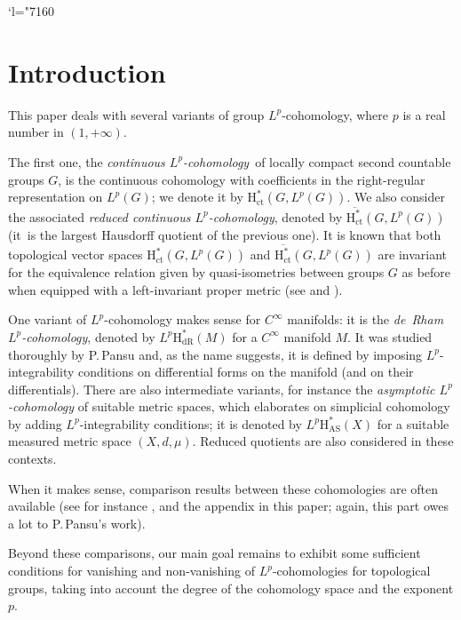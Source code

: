 \documentclass[JEP,XML,SOM,Unicode,published]{cedram}
\newcommand{\Changel}{\mathcode`l="7160}
\newcommand{\AS}{\mathrm{AS}}
\newcommand{\ct}{\mathrm{ct}}
\newcommand{\dR}{\mathrm{dR}}
\newcommand{\rH}{\mathrm{H}}
\theoremstyle{plain}
\theoremstyle{remark}
\theoremstyle{definition}
\begin{document}
\maketitle
\tableofcontents
\mainmatter
\Changel

\section*{Introduction}
\label{1}

This paper deals with several variants of group $L^p$\nobreakdash-cohomology, where $p$ is
a real number in $(1, +\infty)$.

The first one, the \emph{continuous $L^p$\nobreakdash-cohomology}~of locally compact second countable groups $G$, is the continuous cohomology \cite[Chap.\,IX]{BW} with coefficients in the right-regular representation on $L^p(G)$; we denote it by $\rH^*_\ct (G, L^p(G))$.
We also consider the associated \emph{reduced continuous $L^p$\nobreakdash-cohomology}, denoted by $\overline{\rH^*_\ct} (G, L^p(G))$
(it~is the largest Hausdorff quotient of the previous one).
It is known that both topological vector spaces $\rH^*_\ct (G, L^p(G))$ and $\overline{\rH^*_\ct} (G, L^p(G))$ are invariant for the equivalence relation given by quasi-isometries between groups $G$ as before when equipped with a left-invariant proper metric (see \cite[Th.\,1.1]{BR} and \cite{SaSc}).

One variant of $L^p$\nobreakdash-cohomology makes sense for $C^\infty$ manifolds: it is the \emph{de~Rham $L^p$\nobreakdash-cohomology}, denoted by $L^p \rH^*_\dR(M)$ for a $C^\infty$ manifold $M$.
It was studied thoroughly by P.\,Pansu and, as the name suggests, it is defined by imposing $L^p$\nobreakdash-integrability conditions on differential forms on the manifold (and on their differentials).
There are also intermediate variants, for instance the \emph{asymptotic $L^p$\nobreakdash-cohomology} of suitable metric spaces, which elaborates on simplicial cohomology by adding $L^p$\nobreakdash-integrability conditions; it is denoted by $L^p \rH^*_\AS(X)$ for a suitable measured metric space $(X,d,\mu)$.
Reduced quotients are also considered in these contexts.

When it makes sense, comparison results between these cohomologies are often available (see for instance \cite{BR}, \cite{SaSc} and the appendix in this paper; again, this part owes a lot to P.\,Pansu's work).

Beyond these comparisons, our main goal remains to exhibit some sufficient conditions for vanishing and non-vanishing of $L^p$\nobreakdash-cohomologies for topological groups,
taking into account the degree of the cohomology space and the exponent $p$.
\end{document}
